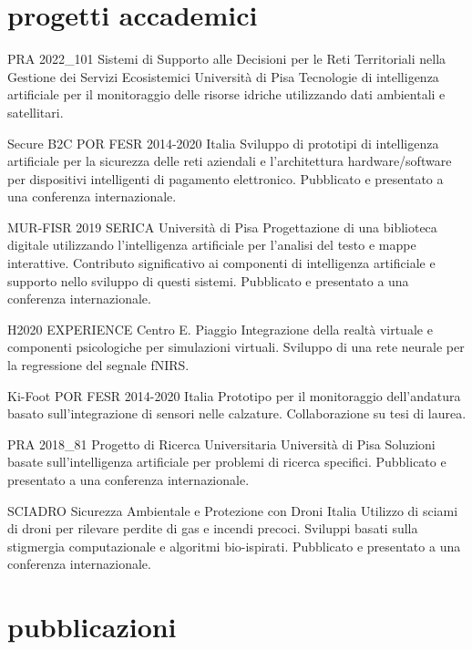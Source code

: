 \documentclass[]{style}
\begin{document}
\section{progetti accademici}
\begin{entrylist}

\entry
{PRA 2022\_101}
{Sistemi di Supporto alle Decisioni per le Reti Territoriali nella Gestione dei Servizi Ecosistemici}
{Università di Pisa}
{Tecnologie di intelligenza artificiale per il monitoraggio delle risorse idriche utilizzando dati ambientali e satellitari.}

\entry
{Secure B2C}
{POR FESR 2014-2020}
{Italia}
{Sviluppo di prototipi di intelligenza artificiale per la sicurezza delle reti aziendali e l'architettura hardware/software per dispositivi intelligenti di pagamento elettronico. Pubblicato e presentato a una conferenza internazionale.}

\entry
{MUR-FISR 2019}
{SERICA}
{Università di Pisa}
{Progettazione di una biblioteca digitale utilizzando l'intelligenza artificiale per l'analisi del testo e mappe interattive. Contributo significativo ai componenti di intelligenza artificiale e supporto nello sviluppo di questi sistemi. Pubblicato e presentato a una conferenza internazionale.}

\entry
{H2020}
{EXPERIENCE}
{Centro E. Piaggio}
{Integrazione della realtà virtuale e componenti psicologiche per simulazioni virtuali. Sviluppo di una rete neurale per la regressione del segnale fNIRS.}

\entry
{Ki-Foot}
{POR FESR 2014-2020}
{Italia}
{Prototipo per il monitoraggio dell'andatura basato sull'integrazione di sensori nelle calzature. Collaborazione su tesi di laurea.}

\entry
{PRA 2018\_81}
{Progetto di Ricerca Universitaria}
{Università di Pisa}
{Soluzioni basate sull'intelligenza artificiale per problemi di ricerca specifici. Pubblicato e presentato a una conferenza internazionale.}

\entry
{SCIADRO}
{Sicurezza Ambientale e Protezione con Droni}
{Italia}
{Utilizzo di sciami di droni per rilevare perdite di gas e incendi precoci. Sviluppi basati sulla stigmergia computazionale e algoritmi bio-ispirati. Pubblicato e presentato a una conferenza internazionale.}

\end{entrylist}

\section{pubblicazioni}
\end{document}
